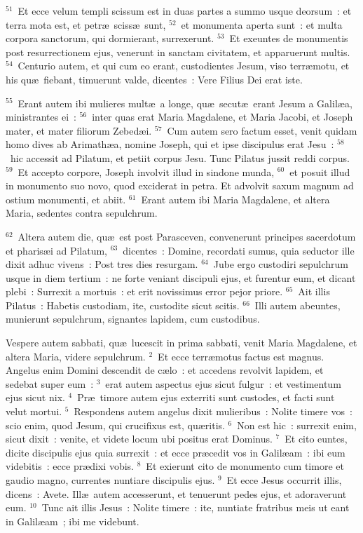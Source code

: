 ${}^{51}$~Et ecce velum templi scissum est in duas partes a summo usque deorsum~: et terra mota est, et petr\ae\ sciss\ae\ sunt,
${}^{52}$~et monumenta aperta sunt~: et multa corpora sanctorum, qui dormierant, surrexerunt.
${}^{53}$~Et exeuntes de monumentis post resurrectionem ejus, venerunt in sanctam civitatem, et apparuerunt multis.
${}^{54}$~Centurio autem, et qui cum eo erant, custodientes Jesum, viso terr\ae motu, et his qu\ae\ fiebant, timuerunt valde, dicentes~: Vere Filius Dei erat iste.


${}^{55}$~Erant autem ibi mulieres mult\ae\ a longe, qu\ae\ secut\ae\ erant Jesum a Galil\ae a, ministrantes ei~:
${}^{56}$~inter quas erat Maria Magdalene, et Maria Jacobi, et Joseph mater, et mater filiorum Zebed\ae i.
${}^{57}$~Cum autem sero factum esset, venit quidam homo dives ab Arimath\ae a, nomine Joseph, qui et ipse discipulus erat Jesu~:
${}^{58}$~hic accessit ad Pilatum, et petiit corpus Jesu. Tunc Pilatus jussit reddi corpus.
${}^{59}$~Et accepto corpore, Joseph involvit illud in sindone munda,
${}^{60}$~et posuit illud in monumento suo novo, quod exciderat in petra. Et advolvit saxum magnum ad ostium monumenti, et abiit.
${}^{61}$~Erant autem ibi Maria Magdalene, et altera Maria, sedentes contra sepulchrum.


${}^{62}$~Altera autem die, qu\ae\ est post Parasceven, convenerunt principes sacerdotum et pharis\ae i ad Pilatum,
${}^{63}$~dicentes~: Domine, recordati sumus, quia seductor ille dixit adhuc vivens~: Post tres dies resurgam.
${}^{64}$~Jube ergo custodiri sepulchrum usque in diem tertium~: ne forte veniant discipuli ejus, et furentur eum, et dicant plebi~: Surrexit a mortuis~: et erit novissimus error pejor priore.
${}^{65}$~Ait illis Pilatus~: Habetis custodiam, ite, custodite sicut scitis.
${}^{66}$~Illi autem abeuntes, munierunt sepulchrum, signantes lapidem, cum custodibus.

\lettrine[lines=10,image=true,loversize=0.05,lraise=-0.03]{V}{}espere autem sabbati, qu\ae\ lucescit in prima sabbati, venit Maria Magdalene, et altera Maria, videre sepulchrum.
${}^{2}$~Et ecce terr\ae motus factus est magnus. Angelus enim Domini descendit de c\ae lo~: et accedens revolvit lapidem, et sedebat super eum~:
${}^{3}$~erat autem aspectus ejus sicut fulgur~: et vestimentum ejus sicut nix.
${}^{4}$~Pr\ae\ timore autem ejus exterriti sunt custodes, et facti sunt velut mortui.
${}^{5}$~Respondens autem angelus dixit mulieribus~: Nolite timere vos~: scio enim, quod Jesum, qui crucifixus est, qu\ae ritis.
${}^{6}$~Non est hic~: surrexit enim, sicut dixit~: venite, et videte locum ubi positus erat Dominus.
${}^{7}$~Et cito euntes, dicite discipulis ejus quia surrexit~: et ecce pr\ae cedit vos in Galil\ae am~: ibi eum videbitis~: ecce pr\ae dixi vobis.
${}^{8}$~Et exierunt cito de monumento cum timore et gaudio magno, currentes nuntiare discipulis ejus.
${}^{9}$~Et ecce Jesus occurrit illis, dicens~: Avete. Ill\ae\ autem accesserunt, et tenuerunt pedes ejus, et adoraverunt eum.
${}^{10}$~Tunc ait illis Jesus~: Nolite timere~: ite, nuntiate fratribus meis ut eant in Galil\ae am~; ibi me videbunt.


